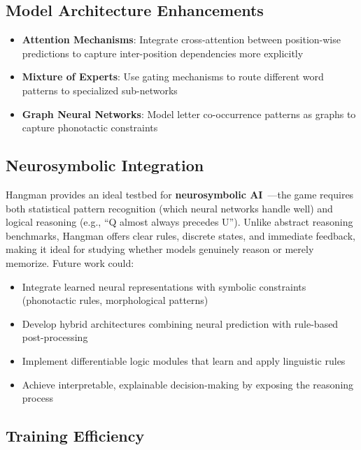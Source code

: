 \documentclass[12pt,a4paper]{article}
\begin{document}
\subsection{Model Architecture Enhancements}

\begin{itemize}
    \item \textbf{Attention Mechanisms}: Integrate cross-attention between position-wise predictions to capture inter-position dependencies more explicitly
    \item \textbf{Mixture of Experts}: Use gating mechanisms to route different word patterns to specialized sub-networks
    \item \textbf{Graph Neural Networks}: Model letter co-occurrence patterns as graphs to capture phonotactic constraints
\end{itemize}

\subsection{Neurosymbolic Integration}

Hangman provides an ideal testbed for \textbf{neurosymbolic AI}~\cite{garcez2019neurosymbolic}—the game requires both statistical pattern recognition (which neural networks handle well) and logical reasoning (e.g., ``Q almost always precedes U''). Unlike abstract reasoning benchmarks, Hangman offers clear rules, discrete states, and immediate feedback, making it ideal for studying whether models genuinely reason or merely memorize. Future work could:

\begin{itemize}
    \item Integrate learned neural representations with symbolic constraints (phonotactic rules, morphological patterns)
    \item Develop hybrid architectures combining neural prediction with rule-based post-processing
    \item Implement differentiable logic modules that learn and apply linguistic rules
    \item Achieve interpretable, explainable decision-making by exposing the reasoning process
\end{itemize}

\subsection{Training Efficiency}
\end{document}
